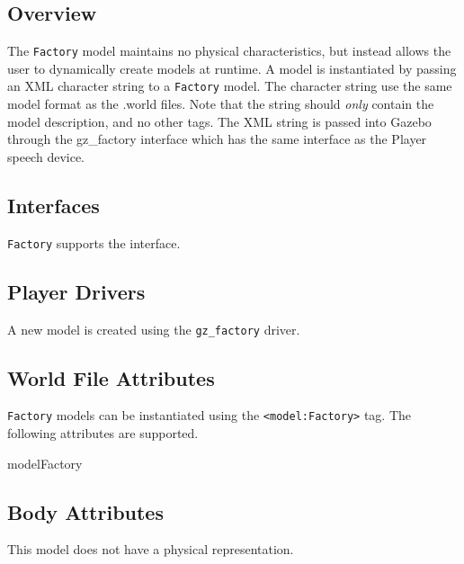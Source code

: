 
\subsection{Overview}

The {\tt Factory} model maintains no physical characteristics, but instead
allows the user to dynamically create models at runtime. A model is
instantiated by passing an XML character string to a {\tt Factory} model.
The character string use the same model format as the .world files. Note
that the string should {\em only} contain the model description, and no
other tags. The XML string is passed into Gazebo through the gz\_factory
interface which has the same interface as the Player speech device.  

\subsection{\libgazebo Interfaces}

{\tt Factory} supports the  interface.


\subsection{Player Drivers}

A new model is created using the {\tt gz\_factory} driver.

\subsection{World File Attributes}

{\tt Factory} models can be instantiated using the \verb+<model:Factory>+
tag. The following attributes are supported.

\begin{xmlattrtable}{model}{Factory}
\end{xmlattrtable}


\subsection{Body Attributes}

This model does not have a physical representation.
